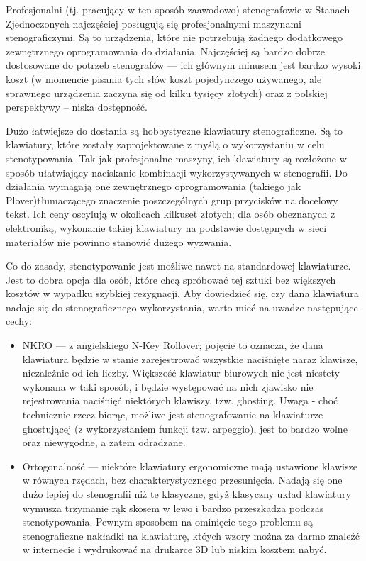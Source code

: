 \documentclass[12p, oneside]{book}
\begin{document}
Profesjonalni (tj. pracujący w ten sposób zaawodowo) stenografowie w Stanach Zjednoczonych najczęściej posługują się profesjonalnymi maszynami stenograficzymi. Są to urządzenia, które nie potrzebują żadnego dodatkowego zewnętrznego oprogramowania do działania. Najczęściej są bardzo dobrze dostosowane do potrzeb stenografów --- ich głównym minusem jest bardzo wysoki koszt (w momencie pisania tych słów koszt pojedynczego używanego, ale sprawnego urządzenia zaczyna się od kilku tysięcy złotych) oraz z polskiej perspektywy -- niska dostępność.

Dużo łatwiejsze do dostania są hobbystyczne klawiatury stenograficzne. Są to klawiatury, które zostały zaprojektowane z myślą o wykorzystaniu w celu stenotypowania. Tak jak profesjonalne maszyny, ich klawiatury są rozłożone w sposób ułatwiający naciskanie kombinacji wykorzystywanych w stenografii. Do działania wymagają one zewnętrznego oprogramowania (takiego jak Plover)tłumaczącego znaczenie poszczególnych grup przycisków na docelowy tekst. Ich ceny oscylują w okolicach kilkuset złotych; dla osób obeznanych z elektroniką, wykonanie takiej klawiatury na podstawie dostępnych w sieci materiałów nie powinno stanowić dużego wyzwania.

Co do zasady, stenotypowanie jest możliwe nawet na standardowej klawiaturze. Jest to dobra opcja dla osób, które chcą spróbować tej sztuki bez większych kosztów w wypadku szybkiej rezygnacji. Aby dowiedzieć się, czy dana klawiatura nadaje się do stenograficznego wykorzystania, warto mieć na uwadze następujące cechy:
\begin{itemize}
	\item NKRO --- z angielskiego N-Key Rollover; pojęcie to oznacza, że dana klawiatura będzie w stanie zarejestrować wszystkie naciśnięte naraz klawisze, niezależnie od ich liczby. Większość klawiatur biurowych nie jest niestety wykonana w taki sposób, i będzie występować na nich zjawisko nie rejestrowania naciśnięć niektórych klawiszy, tzw. ghosting. Uwaga - choć technicznie rzecz biorąc, możliwe jest stenografowanie na klawiaturze ghostującej (z wykorzystaniem funkcji tzw. arpeggio), jest to bardzo wolne oraz niewygodne, a zatem odradzane.
	\item Ortogonalność --- niektóre klawiatury ergonomiczne mają ustawione klawisze w równych rzędach, bez charakterystycznego przesunięcia. Nadają się one dużo lepiej do stenografii niż te klasyczne, gdyż klasyczny układ klawiatury wymusza trzymanie rąk skosem w lewo i bardzo przeszkadza podczas stenotypowania. Pewnym sposobem na ominięcie tego problemu są stenograficzne nakładki na klawiaturę, któych wzory można za darmo znaleźć w internecie i wydrukować na drukarce 3D lub niskim kosztem nabyć.
\end{itemize}
\end{document}

